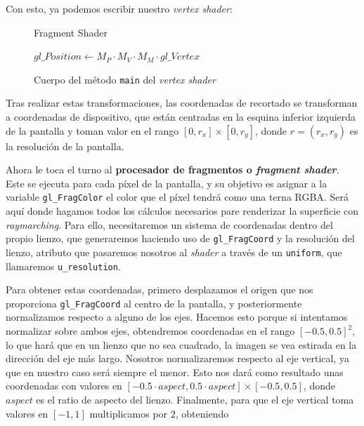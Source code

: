 Con esto, ya podemos escribir nuestro \textit{vertex shader}:
\begin{figure}[ht!]
    \centering
    
       \begin{algorithm}[H]
            \caption{Fragment Shader}
                $gl\_Position \gets M_P \cdot M_V \cdot M_M \cdot gl\_Vertex$
        \end{algorithm}
    \caption{Cuerpo del método \texttt{main} del \textit{vertex shader}}
    \label{fig:mainVS}
\end{figure}

Tras realizar estas transformaciones, las coordenadas de recortado se transforman a coordenadas de dispositivo, que están centradas en la esquina inferior izquierda de la pantalla y toman valor en el rango $[0,r_x]\times [0,r_y]$, donde $r=(r_x,r_y)$ es la resolución de la pantalla.\newline

Ahora le toca el turno al \textbf{procesador de fragmentos o \textit{fragment shader}}. Este se ejecuta para cada píxel de la pantalla, y su objetivo es asignar a la variable \texttt{gl\_FragColor} el color que el píxel tendrá como una terna RGBA. Será aquí donde hagamos todos los cálculos necesarios pare renderizar la superficie con \textit{raymarching}. Para ello, necesitaremos un sistema de coordenadas dentro del propio lienzo, que generaremos haciendo uso de \texttt{gl\_FragCoord} y la resolución del lienzo, atributo que pasaremos nosotros al \textit{shader} a través de un \texttt{uniform}, que llamaremos \texttt{u\_resolution}.\newline

Para obtener estas coordenadas, primero desplazamos el origen que nos proporciona \texttt{gl\_FragCoord} al centro de la pantalla, y posteriormente normalizamos respecto a alguno de los ejes. Hacemos esto porque si intentamos normalizar sobre ambos ejes, obtendremos coordenadas en el rango $[-0.5,0.5]^2$, lo que hará que en un lienzo que no sea cuadrado, la imagen se vea estirada en la dirección del eje más largo. Nosotros normalizaremos respecto al eje vertical, ya que en nuestro caso será siempre el menor. Esto nos dará como resultado unas coordenadas con valores en $\left[ -0.5\cdot aspect, 0.5\cdot aspect \right] \times [-0.5, 0.5]$, donde $aspect$ es el ratio de aspecto del lienzo. Finalmente, para que el eje vertical toma valores en $[-1,1]$ multiplicamos por $2$, obteniendo

